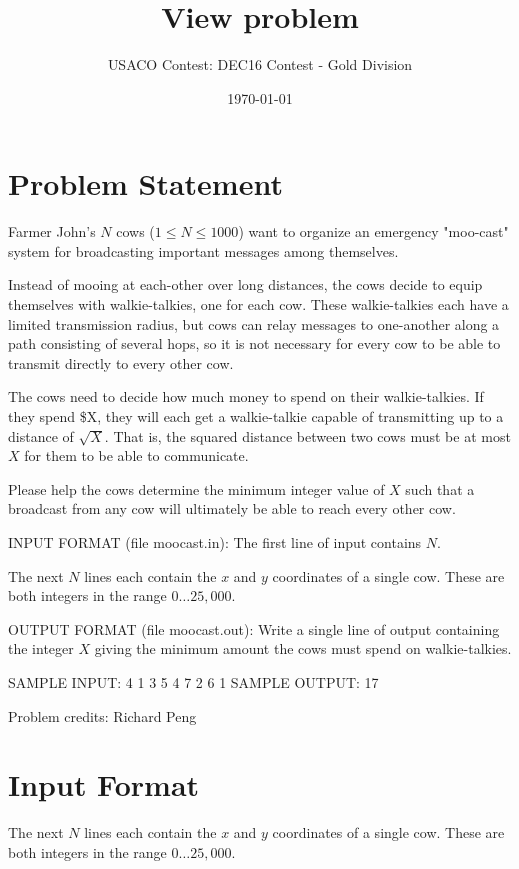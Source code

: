 \documentclass[12pt]{article}
\title{View problem}
\author{USACO Contest: DEC16 Contest - Gold Division}
\date{\today}
\begin{document}
\maketitle

\section*{Problem Statement}

Farmer John's $N$ cows ($1 \leq N \leq 1000$) want to organize an emergency
"moo-cast" system for broadcasting important messages among themselves.  

Instead of mooing at each-other over long distances, the cows decide to equip
themselves with walkie-talkies, one for each cow.  These walkie-talkies each
have a limited  transmission radius, but cows can relay messages to one-another
along a path consisting of several hops, so it is not necessary for every cow to
be able to transmit directly to every other cow.

The cows need to decide how much money to spend on their walkie-talkies.  If
they spend \$X, they will each get a walkie-talkie capable of transmitting up to
a distance of $\sqrt{X}$.  That is, the squared distance between two cows must
be at most $X$ for them to be able to communicate.

Please help the cows determine the minimum integer value of $X$ such that a broadcast
from any cow will ultimately be able to reach every other cow.

INPUT FORMAT (file moocast.in):
The first line of input contains $N$.

The next $N$ lines each contain the $x$ and $y$ coordinates of a single cow. 
These are both integers in the range $0 \ldots 25,000$.

OUTPUT FORMAT (file moocast.out):
Write a single line of output containing the integer $X$ giving the minimum
amount the cows must spend on walkie-talkies.

SAMPLE INPUT:
4
1 3
5 4
7 2
6 1
SAMPLE OUTPUT: 
17

Problem credits: Richard Peng



\section*{Input Format}
The next $N$ lines each contain the $x$ and $y$ coordinates of a single cow. 
These are both integers in the range $0 \ldots 25,000$.
\end{document}
